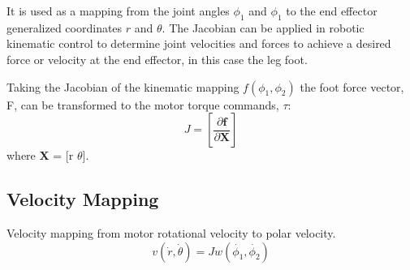 It is used as a mapping from the joint angles $\phi_1$ and $\phi_1$ to the end effector generalized coordinates $r$ and $\theta$. The Jacobian can be applied in robotic kinematic control to determine joint velocities and forces to achieve a desired force or velocity at the end effector, in this case the leg foot.

Taking the Jacobian of the kinematic mapping $f(\phi_1, \phi_2)$ the foot force vector, F, can be transformed to the motor torque commands, $\tau$:
\begin{equation} \label{eq:jacobian}
J = \left[ \frac{\partial \textbf{f}}{\partial \textbf{X}} \right] 
\end{equation}
where \textbf{X} = [r $\theta$].

\subsection{Velocity Mapping}

Velocity mapping from motor rotational velocity to polar velocity.
\begin{equation}
v(\dot{r}, \dot{\theta}) = J w(\dot{\phi_1}, \dot{\phi_2})
\end{equation}

